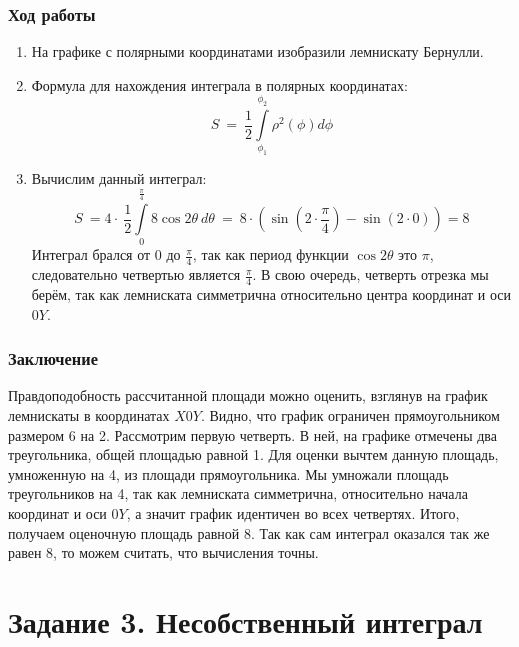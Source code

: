 \documentclass{article}
\begin{document}
\subsubsection*{Ход работы}

\begin{enumerate}
    \item На графике с полярными координатами изобразили лемнискату Бернулли.
    
    \item Формула для нахождения интеграла в полярных координатах:
    $$
    S\ =\ \frac{1}{2}\int\limits_{\phi_{1}}^{\phi_{2}}\rho^{2}\left(\phi\right)d\phi$$
    
    \item Вычислим данный интеграл:
    $$
    S\ =4\cdot\ \frac{1}{2}\int\limits_{0}^{\frac{\pi}{4}}8\cos2\theta\ d\theta\ =\ 8\cdot\left(\sin\left(2\cdot\frac{\pi}{4}\right)-\sin\left(2\cdot0\right)\right)=8
    $$
        Интеграл брался от 0 до $\frac{\pi}{4}$, так как период функции $\cos2\theta$ это $\pi$, следовательно четвертью является $\frac{\pi}{4}$. В свою очередь, четверть отрезка мы берём, так как лемниската симметрична относительно центра координат и оси $0Y$.

    
\end{enumerate}

\subsubsection*{Заключение}

Правдоподобность рассчитанной площади можно оценить, взглянув на график лемнискаты в координатах $X0Y$. Видно, что график ограничен прямоугольником размером 6 на 2. Рассмотрим первую четверть. В ней, на графике отмечены два треугольника, общей площадью равной 1. Для оценки вычтем данную площадь, умноженную на 4, из площади прямоугольника. Мы умножали площадь треугольников на 4, так как лемниската симметрична, относительно начала координат и оси $0Y$, а значит график идентичен во всех четвертях. Итого, получаем оценочную площадь равной 8. Так как сам интеграл оказался так же равен 8, то можем считать, что вычисления точны.

\newpage


\section{Задание 3. Несобственный интеграл}
\end{document}

